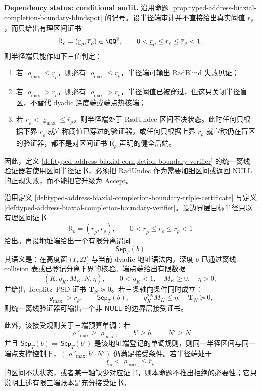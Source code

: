 \begin{proposition}[边界半径阈值的区间认证正规形]\label{prop:distill-euclid-elements-boundary-radius-interval-normal-form}
\textbf{Dependency status: conditional audit.}
沿用命题 \ref{prop:typed-address-biaxial-completion-boundary-blindspot} 的记号。设半径端审计并不直接给出真实阈值 \(r_\rho\)，而只给出有理区间证书
\[
\mathsf R_\rho=(\underline r_\rho,\overline r_\rho)\in\QQ^2,
\qquad
0<\underline r_\rho\le r_\rho\le \overline r_\rho<1.
\]
则半径端只能作如下三值判定：
\begin{enumerate}
  \item 若 \(\varrho_{\max}\le \underline r_\rho\)，则必有 \(\varrho_{\max}\le r_\rho\)，半径端可输出 \(\mathrm{RadBlind}\) 失败见证；
  \item 若 \(\varrho_{\max}>\overline r_\rho\)，则必有 \(\varrho_{\max}>r_\rho\)，半径阈值已被穿过，但这只关闭半径盲区，不替代 dyadic 深度端或端点热核端；
  \item 若 \(\underline r_\rho<\varrho_{\max}\le\overline r_\rho\)，则半径端处于 \(\mathrm{RadUndec}\) 区间不决状态。此时任何只根据下界 \(\underline r_\rho\) 就宣称阈值已穿过的验证器，或任何只根据上界 \(\overline r_\rho\) 就宣称仍在盲区的验证器，都不是对区间证书 \(\mathsf R_\rho\) 声明的健全后端。
\end{enumerate}
因此，定义 \ref{def:typed-address-biaxial-completion-boundary-verifier} 的统一离线验证器若使用区间半径证书，必须把 \(\mathrm{RadUndec}\) 作为需要加细区间或返回 \(\mathrm{NULL}\) 的正规失败，而不能把它升级为 \(\mathrm{Accept}\)。
\end{proposition}

\begin{proposition}[三端区间证书的轴向充分接受律]\label{distill:euclid_elements-finite_construction_certificate_families-boundary-axiswise-sufficient-acceptance}
沿用定义 \ref{def:typed-address-biaxial-completion-boundary-triple-certificate} 与定义 \ref{def:typed-address-biaxial-completion-boundary-verifier}。设边界层目标半径只以有理区间证书
\[
\mathsf R_\rho=(\underline r_\rho,\overline r_\rho),
\qquad
0<\underline r_\rho\le r_\rho\le\overline r_\rho<1
\]
给出。再设地址端给出一个有限分离谓词
\[
\mathsf{Sep}_T(b)
\]
其语义是：在高度窗 \((T,2T]\) 与当前 dyadic 地址语法内，深度 \(b\) 已通过离线 collision 表或已登记分离下界的核验。端点端给出有限数据
\[
(K,q_K,M_K,N,\eta),
\qquad
0<q_K<1,\quad M_K\ge0,\quad \eta>0,
\]
并给出 Toeplitz--PSD 证书 \(\mathbf T_N\succeq0\)。若三条轴向条件同时成立：
\[
\varrho_{\max}>\overline r_\rho,
\qquad
\mathsf{Sep}_T(b),
\qquad
q_K^{2N}M_K\le\eta,\quad \mathbf T_N\succeq0,
\]
则统一离线验证器可输出一个非 \(\mathsf{NULL}\) 的边界层接受证书。

此外，该接受规则关于三端预算单调：若
\[
\varrho'_{\max}\ge\varrho_{\max},\qquad b'\ge b,\qquad N'\ge N
\]
并且 \(\mathsf{Sep}_T(b)\Rightarrow\mathsf{Sep}_T(b')\) 是该地址端登记的单调规则，则同一半径区间与同一端点支撑控制下，\((\varrho'_{\max},b',N')\) 仍满足接受条件。若半径端处于
\[
\underline r_\rho<\varrho_{\max}\le\overline r_\rho
\]
的区间不决状态，或者某一轴缺少对应证书，则本命题不推出拒绝的必要性；它只说明上述有限三端账本是充分接受证书。
\end{proposition}

